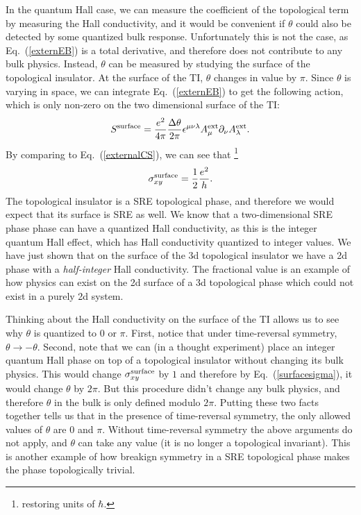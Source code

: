 In the quantum Hall case, we can measure the coefficient of the topological term by measuring the Hall conductivity, and it would be convenient if $\theta$ could also be detected by some quantized bulk response. Unfortunately this is not the case, as Eq.~(\ref{externEB}) is a total derivative, and therefore does not contribute to any bulk physics. Instead, $\theta$ can be measured by studying the surface of the topological insulator. At the surface of the TI, $\theta$ changes in value by $\pi$. Since $\theta$ is varying in space, we can integrate Eq.~(\ref{externEB}) to get the following action, which is only non-zero on the two dimensional surface of the TI:
\begin{equation}
S^{\rm surface}=\frac{e^2}{4\pi}\frac{\Delta\theta}{2\pi} \epsilon^{\mu\nu\lambda} A^{\rm ext}_\mu \partial_\nu A^{\rm ext}_\lambda.
\label{TIsurface}
\end{equation}
By comparing to Eq.~(\ref{externalCS}), we can see that 
\footnote{restoring units of $\hbar$.}
\begin{equation}
\sigma_{xy}^{\rm surface}=\frac12\frac{e^2}{h}.
\label{surfacesigma}
\end{equation}
The topological insulator is a SRE topological phase, and therefore we would expect that its surface is SRE as well. We know that a two-dimensional SRE phase phase can have a quantized Hall conductivity, as this is the integer quantum Hall effect, which has Hall conductivity quantized to integer values. We have just shown that on the surface of the 3d topological insulator we have a 2d phase with a {\em half-integer} Hall conductivity. 
The fractional value is an example of how physics can exist on the 2d surface of a 3d topological phase which could not exist in a purely 2d system.

Thinking about the Hall conductivity on the surface of the TI allows us to see why $\theta$ is quantized to $0$ or $\pi$. First, notice that under time-reversal symmetry, $\theta\rightarrow-\theta$. Second, note that we can (in a thought experiment) place an integer quantum Hall phase on top of a topological insulator without changing its bulk physics. This would change $\sigma_{xy}^{\rm surface}$ by $1$ and therefore by Eq.~(\ref{surfacesigma}), it would change $\theta$ by $2\pi$. But this procedure didn't change any bulk physics, and therefore $\theta$ in the bulk is only defined modulo $2\pi$. Putting these two facts together tells us that in the presence of time-reversal symmetry, the only allowed values of $\theta$ are $0$ and $\pi$. Without time-reversal symmetry the above arguments do not apply, and $\theta$ can take any value (it is no longer a topological invariant). This is another example of how breakign symmetry in a SRE topological phase makes the phase topologically trivial.

